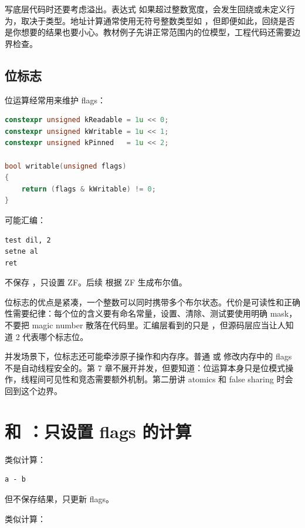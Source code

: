 写底层代码时还要考虑溢出。表达式  如果超过整数宽度，会发生回绕或未定义行为，取决于类型。地址计算通常使用无符号整数类型如 ，但即便如此，回绕是否是你想要的结果也要小心。教材例子先讲正常范围内的位模型，工程代码还需要边界检查。

\subsection{位标志}

位运算经常用来维护 flags：

\begin{lstlisting}[language=C++]
constexpr unsigned kReadable = 1u << 0;
constexpr unsigned kWritable = 1u << 1;
constexpr unsigned kPinned   = 1u << 2;

bool writable(unsigned flags)
{
    return (flags & kWritable) != 0;
}
\end{lstlisting}

可能汇编：

\begin{lstlisting}
test dil, 2
setne al
ret
\end{lstlisting}

 不保存 ，只设置 ZF。后续  根据 ZF 生成布尔值。

位标志的优点是紧凑，一个整数可以同时携带多个布尔状态。代价是可读性和正确性需要纪律：每个位的含义要有命名常量，设置、清除、测试要使用明确 mask，不要把 magic number 散落在代码里。汇编层看到的只是 ，但源码层应当让人知道 2 代表哪个标志位。

并发场景下，位标志还可能牵涉原子操作和内存序。普通  或  修改内存中的 flags 不是自动线程安全的。第 7 章不展开并发，但要知道：位运算本身只是位模式操作，线程间可见性和竞态需要额外机制。第二册讲 atomics 和 false sharing 时会回到这个边界。

\section{ 和 ：只设置 flags 的计算}

 类似计算：

\begin{lstlisting}
a - b
\end{lstlisting}

但不保存结果，只更新 flags。

 类似计算：

